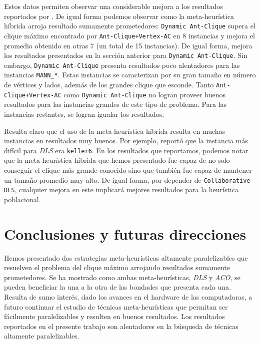\documentclass[conference]{IEEEtran}
\begin{document}
Estos datos permiten observar una considerable mejora a los resultados
reportados por \cite{aco1,aco2}. De igual forma podemos observar como
la meta-heurística híbrida arroja resultado sumamente prometedores:
\texttt{Dynamic Ant-Clique} supera el clique máximo encontrado por
\texttt{Ant-Clique+Vertex-AC} en 8 instancias y mejora el promedio
obtenido en otras 7 (un total de 15 instancias). De igual forma,
mejora los resultados presentados en la sección anterior para
\texttt{Dynamic Ant-Clique}. Sin embargo, \texttt{Dynamic Ant-Clique}
presenta resultados poco alentadores para las instancias
\texttt{MANN\_*}. Estas instancias se caracterizan por su gran tamaño
en número de vértices y lados, además de los grandes clique que
esconde. Tanto \texttt{Ant-Clique+Vertex-AC} como \texttt{Dynamic
  Ant-Clique} no logran proveer buenos resultados para las instancias
grandes de este tipo de problema. Para las instancias restantes, se
logran igualar los resultados.

Resulta claro que el uso de la meta-heurística híbrida resulta en
muchas instancias en resultados muy buenos. Por ejemplo,
\cite{dynamicl} reportó que la instancia más difícil para \emph{DLS}
era \texttt{keller6}. En los resultados que reportamos, podemos notar
que la meta-heurística híbrida que hemos presentado fue capaz de no
solo conseguir el clique más grande conocido sino que también fue
capaz de mantener un tamaño promedio muy alto. De igual forma, por
depender de \texttt{Collaborative DLS}, cualquier mejora en este
implicará mejores resultados para la heurística poblacional.


\section{Conclusiones y futuras direcciones}
\label{sec:conclusions}

Hemos presentado dos estrategias meta-heurísticas altamente
paralelizables que resuelven el problema del clique máximo arrojando
resultados sumamente prometedores. Se ha mostrado como ambas
meta-heurísticas, \emph{DLS} y \emph{ACO}, se pueden beneficiar la una
a la otra de las bondades que presenta cada una. Resulta de sumo
interés, dado los avances en el hardware de las computadoras, a futuro
continuar el estudio de técnicas meta-heurísticas que permitan ser
fácilmente paralelizables y resulten en buenos resultados. Los
resultados reportados en el presente trabajo son alentadores en la
búsqueda de técnicas altamente paralelizables.
\end{document}
